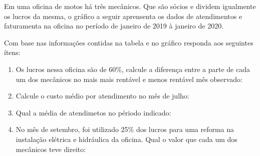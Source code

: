 \item Em uma oficina de motos há três mecânicos. Que são sócios e dividem igualmente os lucros da mesma, o gráfico a seguir aprensenta os dados de atendimentos e faturamenta na oficina no período de janeiro de 2019 à janeiro de 2020.


Com base nas informações contidas na tabela e no gráfico responda aos seguintes ítens:

\begin{enumerate}[a]
\item Os lucros nessa oficina são de 60\%, calcule a diferença entre a parte de cada um dos mecânicos no mais mais rentável e menos rentável mês observado:
\item Calcule o custo médio por atendimento no mês de julho:
\item Qual a média de atendimetos no périodo indicado:
\item No mês de setembro, foi utilizado 25\% dos lucros para uma reforma na instalação elétrica e hidráulica da oficina. Qual o valor que cada um dos mecânicos teve direito:
\end{enumerate}
